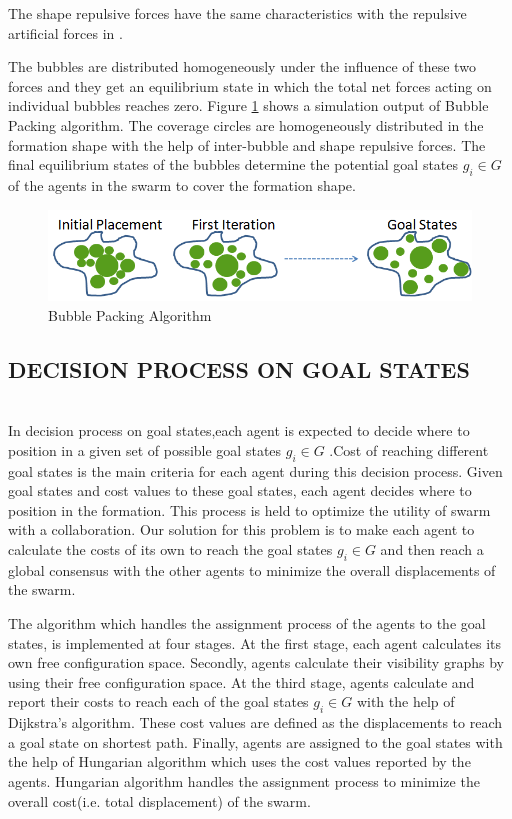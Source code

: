 \documentclass[letterpaper, 10 pt, conference]{ieeeconf}  %
\begin{document}
The shape repulsive forces have the same characteristics with the repulsive artificial forces in \cite{17}.
	
The bubbles are distributed homogeneously under the influence of these two forces and they get an equilibrium state in which the total net forces acting on individual bubbles reaches zero. Figure \ref{buble_ornek} shows a simulation output of Bubble Packing algorithm. The coverage circles are homogeneously distributed in the formation shape with the help of inter-bubble and shape repulsive forces. The final equilibrium states of the bubbles determine the potential goal states $g_i \in G$  of the agents in the swarm to cover the formation shape.

\begin{figure}[thpb]
      \centering     
      \includegraphics[scale = 0.35]{bubble_packing2}
    \caption{Bubble Packing Algorithm} \label{buble_ornek}
\end{figure} 
	
\subsection{DECISION PROCESS ON GOAL STATES}\hspace{0pt} \label{DecisionProcess Ref} \\
In decision process on goal states,each agent is expected to decide where to position in a given set of possible goal states $g_i \in G$ .Cost of reaching different goal states is the main criteria for each agent during this decision process. Given goal states and cost values to these goal states, each agent decides where to position in the formation. This process is held to optimize the utility of swarm with a collaboration. Our solution for this problem is to make each agent to calculate the costs of its own to reach the goal states $g_i \in G$ and then reach a global consensus with the other agents to minimize the overall displacements of the swarm. 

The algorithm which handles the assignment process of the agents to the goal states, is implemented at four stages. At the first stage, each agent calculates its own free configuration space. Secondly, agents calculate their visibility graphs by using their free configuration space. At the third stage,  agents calculate and report their costs to reach each of the goal states $g_i \in G$ with the help of Dijkstra's algorithm. These cost values are defined as the displacements to reach a goal state on shortest path.  Finally, agents are assigned to the goal states with the help of Hungarian algorithm which uses the cost values reported by the agents. Hungarian algorithm handles the assignment process to minimize the overall cost(i.e. total displacement) of the swarm.
	
\end{document}
